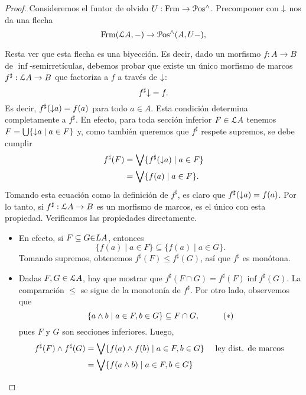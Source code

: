 \begin{proof}
    Consideremos el funtor de olvido $U:\Frm\to\Pos^{\inf}$.
    Precomponer con $\down$ nos da una flecha
    \[
        \Frm(\cal LA,-)\to \Pos^{\inf}(A,U-)
    ,\]
    
    Resta ver que esta flecha es una biyección.
    Es decir, dado un morfismo $f:A\to B$
    de $\inf$-semirretículas,
    debemos probar que existe un único morfismo de marcos
    $f^\sharp:\cal LA\to B$ que factoriza a $f$ a través
    de $\down$:
    \[
        f^\sharp\down = f
    .\]
    Es decir, $f^\sharp(\down a)=f(a)$ para todo $a\in A$.
    Esta condición determina completamente a $f^\sharp$.
    En efecto, para toda sección inferior $F\in\cal LA$ tenemos
    $F=\bigcup\{\down a \mid a\in F\}$ y, como también queremos
    que $f^\sharp$ respete supremos, se debe cumplir
    \begin{align*}
        f^\sharp(F)
        &= \Sup\{f^\sharp(\down a) \mid a\in F\} \\
        &= \Sup\{f(a) \mid a\in F\}.
    \end{align*}
    Tomando esta ecuación como la definición de $f^\sharp$, es
    claro que $f^\sharp(\down a)=f(a)$.
    Por lo tanto, si $f^\sharp:\cal LA\to B$ es un
    morfismo de marcos, es el único con esta propiedad.
    Verificamos las propiedades directamente.
    \begin{itemize}
        \item En efecto, si $F\subseteq G\cal\in LA$, entonces 
        \[
            \{f(a) \mid a\in F\} \subseteq \{f(a) \mid a\in G\}
        .\]
        Tomando supremos, obtenemos
        $f^\sharp(F)\leq f^\sharp(G)$, así que $f^\sharp$ es
        monótona.
        \item
        Dadas $F,G\in\cal LA$, hay que mostrar
        que $f^\sharp(F\cap G)=f^\sharp(F)\inf f^\sharp(G)$.
        La comparación $\leq$ se sigue de la monotonía de
        $f^\sharp$.
        Por otro lado, observemos que
        \[
            \{ a\inf b \mid a\in F, b\in G\}
            \subseteq F\cap G,
            \hspace{10mm} (*)
        \]
        pues $F$ y $G$ son secciones inferiores.
        Luego,
        \begin{align*}
            f^\sharp(F)\inf f^\sharp(G)
            &= \Sup\{f(a)\inf f(b) \mid a\in F, b\in G\}
                && \text{ ley dist. de marcos } \\
            &= \Sup\{f(a\inf b) \mid a\in F, b\in G\} \\

\end{align*}
\end{itemize}
\end{proof}
